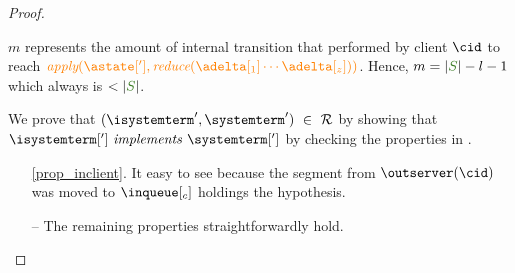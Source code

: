 \begin{proof}
\begin{itemize}
\begin{itemize}
\begin{itemize}
				$m$ represents the amount of internal transition that performed by client $\cid$ to reach $\iapply{\astate[']}{\ireduce{\adelta[_1]\cdots\adelta[_{z}]}}$. Hence, $m =  |\queuemessage| - l - 1$ which always is $< |\queuemessage|$.   


								
				We  prove that $(\isystemterm',\systemterm') \ \in \ \mathcal{R}$ by showing that $\implements{\isystemterm[']}{\systemterm[']}$ 
				by checking the properties in .	
				\begin{itemize}	
	
					\item[\ref{prop_inclient}.] It easy to see because the segment from $\outserver(\cid)$ was moved to $\inclient$ holdings the hypothesis.
					
					
					\item[{--}] The remaining properties straightforwardly hold.
							
				\end{itemize}	
	
					
							
				\end{itemize}

				
				




							

\end{itemize}
\end{itemize}
\end{proof}

